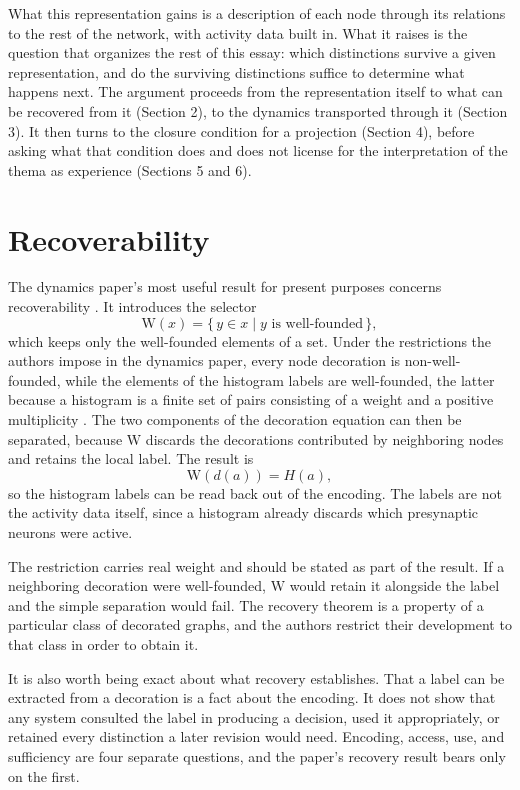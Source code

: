 \documentclass[11pt, a4paper]{article}
\theoremstyle{plain}
\theoremstyle{definition}
\theoremstyle{remark}
\newcommand{\lift}{\mathrm{W}}
\begin{document}
What this representation gains is a description of each node through its relations to the rest of the network, with activity data built in. What it raises is the question that organizes the rest of this essay: which distinctions survive a given representation, and do the surviving distinctions suffice to determine what happens next. The argument proceeds from the representation itself to what can be recovered from it (Section 2), to the dynamics transported through it (Section 3). It then turns to the closure condition for a projection (Section 4), before asking what that condition does and does not license for the interpretation of the thema as experience (Sections 5 and 6).

\section{Recoverability}

The dynamics paper's most useful result for present purposes concerns recoverability \cite{mz2010}. It introduces the selector
\[
\lift(x) = \{\, y \in x \mid y \text{ is well-founded} \,\},
\]
which keeps only the well-founded elements of a set. Under the restrictions the authors impose in the dynamics paper, every node decoration is non-well-founded, while the elements of the histogram labels are well-founded, the latter because a histogram is a finite set of pairs consisting of a weight and a positive multiplicity \cite{mz2009}. The two components of the decoration equation can then be separated, because $\lift$ discards the decorations contributed by neighboring nodes and retains the local label. The result is
\[
\lift(d(a)) = H(a),
\]
so the histogram labels can be read back out of the encoding. The labels are not the activity data itself, since a histogram already discards which presynaptic neurons were active.

The restriction carries real weight and should be stated as part of the result. If a neighboring decoration were well-founded, $\lift$ would retain it alongside the label and the simple separation would fail. The recovery theorem is a property of a particular class of decorated graphs, and the authors restrict their development to that class in order to obtain it.

It is also worth being exact about what recovery establishes. That a label can be extracted from a decoration is a fact about the encoding. It does not show that any system consulted the label in producing a decision, used it appropriately, or retained every distinction a later revision would need. Encoding, access, use, and sufficiency are four separate questions, and the paper's recovery result bears only on the first.
\end{document}
